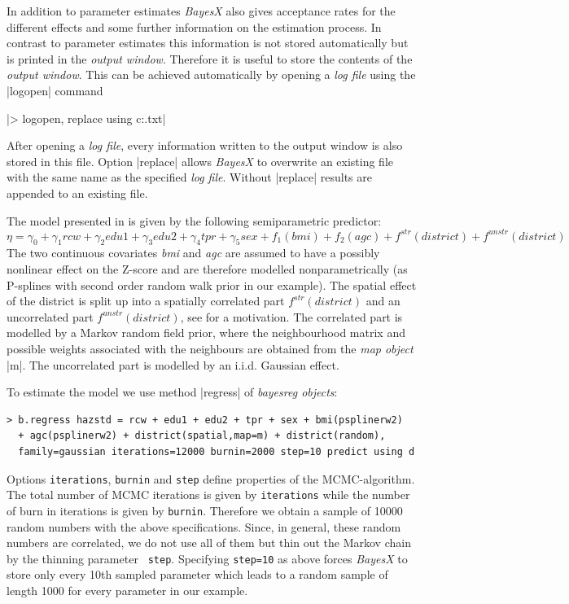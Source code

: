 \documentclass[a4paper]{article}
\begin{document}
In addition to parameter estimates {\it BayesX} also gives acceptance rates for the different effects and some further
information on the estimation process. In contrast to parameter estimates this information is not stored automatically but is
printed in the {\it output window}. Therefore it is useful to store the contents of the {\it output window}. This can be
achieved automatically by opening a {\it log file} using the |logopen| command

|> logopen, replace using c:\data\logmcmc.txt|

After opening a {\it log file}, every information written to the output window is also stored in this file. Option |replace|
allows {\it BayesX} to overwrite an existing file with the same name as the specified {\it log file}. Without |replace| results
are appended to an existing file.

The model presented in  is given by the
following semiparametric predictor:
\[\eta=\gamma_0+\gamma_1rcw+\gamma_2edu1+\gamma_3edu2+\gamma_4tpr+\gamma_5sex+f_1(bmi)+f_2(agc)+f^{str}(district)+f^{unstr}(district)\]
The two continuous covariates {\em bmi} and {\em agc} are assumed to have a possibly nonlinear effect on the Z-score and are
therefore modelled nonparametrically (as P-splines with second order random walk prior in our example). The spatial effect of
the district is split up into a spatially correlated part $ f^{str}(district)$ and an uncorrelated part $f^{unstr}(district)$,
see  for a motivation. The correlated part is modelled by a Markov random field
prior, where the neighbourhood matrix and possible weights associated with the neighbours are obtained from the {\it map
object} |m|. The uncorrelated part is modelled by an i.i.d. Gaussian effect.

To estimate the model we use method |regress| of {\em bayesreg objects}:
\begin{verbatim}
> b.regress hazstd = rcw + edu1 + edu2 + tpr + sex + bmi(psplinerw2)
  + agc(psplinerw2) + district(spatial,map=m) + district(random),
  family=gaussian iterations=12000 burnin=2000 step=10 predict using d
\end{verbatim}

Options {\tt iterations}, {\tt burnin} and {\tt step} define
properties of the MCMC-algorithm. The total number of MCMC
iterations is given by {\tt iterations} while the number of burn in
iterations is given by {\tt burnin}. Therefore we obtain a sample of
10000 random numbers with the above specifications. Since, in
general, these random numbers are correlated, we do not use all of
them but thin out the Markov chain by the thinning parameter {\tt
step}. Specifying {\tt step=10} as above forces {\em BayesX} to
store only every 10th sampled parameter which leads to a random
sample of length 1000 for every parameter in our example.
\end{document}
